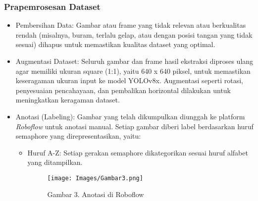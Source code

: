 \documentclass[12pt,a4paper]{article}
\begin{document}
\subsubsection{Prapemrosesan Dataset}
\begin{itemize}
    \item Pembersihan Data: Gambar atau frame yang tidak relevan atau berkualitas rendah (misalnya, buram, terlalu gelap, atau dengan posisi tangan yang tidak sesuai) dihapus untuk memastikan kualitas dataset yang optimal.
    \item Augmentasi Dataset: Seluruh gambar dan frame hasil ekstraksi diproses ulang agar memiliki ukuran square (1:1), yaitu 640 x 640 piksel, untuk memastikan keseragaman ukuran input ke model YOLOv8x. Augmentasi seperti rotasi, penyesuaian pencahayaan, dan pembalikan horizontal dilakukan untuk meningkatkan keragaman dataset.
    \item Anotasi (Labeling): Gambar yang telah dikumpulkan diunggah ke platform \textit{Roboflow} untuk anotasi manual. Setiap gambar diberi label berdasarkan huruf semaphore yang direpresentasikan, yaitu: 
    \begin{itemize}
        \item Huruf A-Z: Setiap gerakan semaphore dikategorikan sesuai huruf alfabet yang ditampilkan.
        \begin{figure}[h]
            \centering
            \texttt{[image: Images/Gambar3.png]}
            \caption*{Gambar 3. Anotasi di Roboflow}
            \label{fig:enter-label}
        \end{figure}
    \end{itemize}
\end{itemize}
\end{document}
